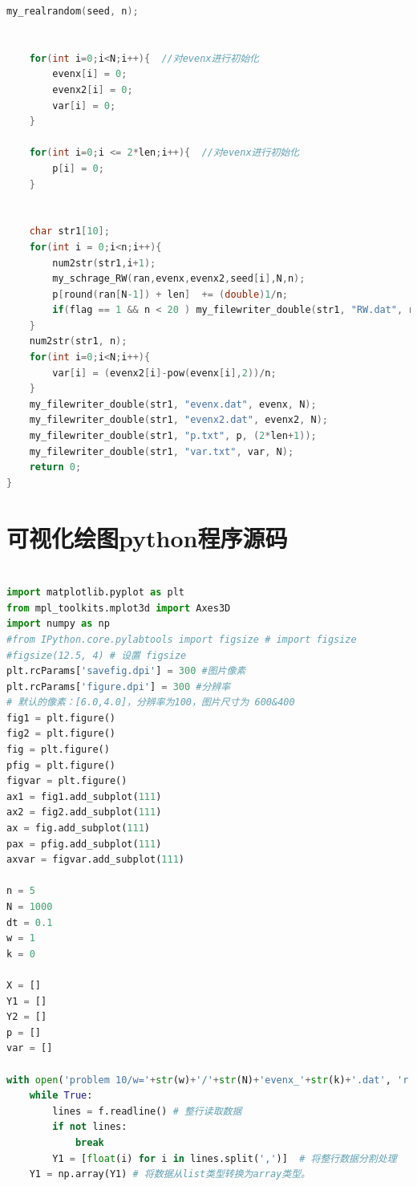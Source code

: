 \documentclass[a4paper,11pt]{article}
\begin{document}
\begin{appendices}
\begin{lstlisting}[language = C]
    my_realrandom(seed, n);
    

    for(int i=0;i<N;i++){  //对evenx进行初始化
        evenx[i] = 0;
        evenx2[i] = 0;
        var[i] = 0;
    }
    
    for(int i=0;i <= 2*len;i++){  //对evenx进行初始化
        p[i] = 0;
    }
    
    
    char str1[10];
    for(int i = 0;i<n;i++){
        num2str(str1,i+1);
        my_schrage_RW(ran,evenx,evenx2,seed[i],N,n);
        p[round(ran[N-1]) + len]  += (double)1/n;
        if(flag == 1 && n < 20 ) my_filewriter_double(str1, "RW.dat", ran, N);
    }
    num2str(str1, n);
    for(int i=0;i<N;i++){
        var[i] = (evenx2[i]-pow(evenx[i],2))/n;
    }
    my_filewriter_double(str1, "evenx.dat", evenx, N);
    my_filewriter_double(str1, "evenx2.dat", evenx2, N);
    my_filewriter_double(str1, "p.txt", p, (2*len+1));
    my_filewriter_double(str1, "var.txt", var, N);
    return 0;
}

\end{lstlisting}

\newpage

\section{可视化绘图python程序源码}

\begin{lstlisting}[language = python]

import matplotlib.pyplot as plt
from mpl_toolkits.mplot3d import Axes3D
import numpy as np
#from IPython.core.pylabtools import figsize # import figsize
#figsize(12.5, 4) # 设置 figsize
plt.rcParams['savefig.dpi'] = 300 #图片像素
plt.rcParams['figure.dpi'] = 300 #分辨率
# 默认的像素：[6.0,4.0]，分辨率为100，图片尺寸为 600&400
fig1 = plt.figure()
fig2 = plt.figure()
fig = plt.figure()
pfig = plt.figure()
figvar = plt.figure()
ax1 = fig1.add_subplot(111)
ax2 = fig2.add_subplot(111)
ax = fig.add_subplot(111)
pax = pfig.add_subplot(111)
axvar = figvar.add_subplot(111)

n = 5
N = 1000
dt = 0.1
w = 1
k = 0

X = []
Y1 = []
Y2 = []
p = []
var = []

with open('problem 10/w='+str(w)+'/'+str(N)+'evenx_'+str(k)+'.dat', 'r') as f:
    while True:
        lines = f.readline() # 整行读取数据
        if not lines:
            break
        Y1 = [float(i) for i in lines.split(',')]  # 将整行数据分割处理
    Y1 = np.array(Y1) # 将数据从list类型转换为array类型。


\end{lstlisting}
\end{appendices}
\end{document}
